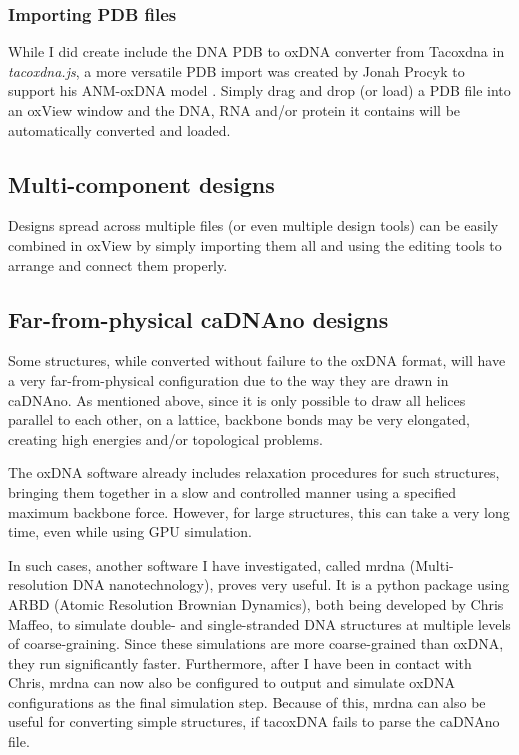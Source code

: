 \subsubsection{Importing PDB files}
While I did create include the DNA PDB to oxDNA converter from Tacoxdna in \emph{tacoxdna.js}, a more versatile PDB import was created by Jonah Procyk to support his ANM-oxDNA model \cite{procyk2021coarse}. Simply drag and drop (or load) a PDB file into an oxView window and the DNA, RNA and/or protein it contains will be automatically converted and loaded.


\subsection{Multi-component designs}
Designs spread across multiple files (or even multiple design tools) can be easily combined in oxView by simply importing them all and using the editing tools to arrange and connect them properly.

\subsection{Far-from-physical caDNAno designs}
Some structures, while converted without failure to the oxDNA format, will have a very far-from-physical configuration due to the way they are drawn in caDNAno. As mentioned above, since it is only possible to draw all helices parallel to each other, on a lattice, backbone bonds may be very elongated, creating high energies and/or topological problems.

The oxDNA software already includes relaxation procedures for such structures, bringing them together in a slow and controlled manner using a specified maximum backbone force. However, for large structures, this can take a very long time, even while using GPU simulation.

In such cases, another software I have investigated, called mrdna (Multi-resolution DNA nanotechnology), proves very useful\cite{maffeo2018}. It is a python package using ARBD (Atomic Resolution Brownian Dynamics), both being developed by Chris Maffeo, to simulate double- and single-stranded DNA structures at multiple levels of coarse-graining. Since these simulations are more coarse-grained than oxDNA, they run significantly faster. Furthermore, after I have been in contact with Chris, mrdna can now also be configured to output and simulate oxDNA configurations as the final simulation step. Because of this, mrdna can also be useful for converting simple structures, if tacoxDNA fails to parse the caDNAno file.

